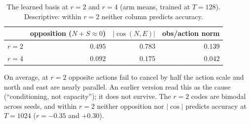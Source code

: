 \documentclass[11pt]{article}
\begin{document}
\begin{table}[htbp]\centering\small
\caption{The learned basis at $r=2$ and $r=4$ (arm means, trained at $T=128$). Descriptive: within $r=2$ neither column predicts accuracy.}
\label{tab:basis}
\begin{tabular}{lrrr}
\toprule
 & opposition ($N{+}S\approx0$) & $|\cos(N,E)|$ & obs/action norm \\
\midrule
$r=2$ & $0.495$ & $0.783$ & $0.139$ \\
$r=4$ & $\mathbf{0.092}$ & $\mathbf{0.175}$ & $0.042$ \\
\bottomrule
\end{tabular}
\end{table}

\noindent On average, at $r=2$ opposite actions fail to cancel by half the action scale
and north and east are nearly parallel. An earlier version read this as the cause
(``conditioning, not capacity''); it does not survive. The $r=2$ codes are bimodal
across seeds, and within $r=2$ neither opposition nor $|\cos|$ predicts accuracy at
$T=1024$ ($r=-0.35$ and $+0.30$).
\end{document}

